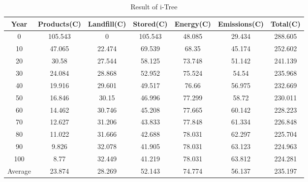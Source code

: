 \documentclass{mcmthesis}
\numberwithin{figure}{section}
\numberwithin{table}{section}
\numberwithin{equation}{section}
\begin{document}
\begin{appendices}
\begin{table}[]
  \caption{Result of i-Tree}\label{iTree}
  \begin{tabular}{
  >{\columncolor[HTML]{FFFFFF}}c |
  >{\columncolor[HTML]{FFFFFF}}c 
  >{\columncolor[HTML]{FFFFFF}}c 
  >{\columncolor[HTML]{FFFFFF}}c 
  >{\columncolor[HTML]{FFFFFF}}c 
  >{\columncolor[HTML]{FFFFFF}}c 
  >{\columncolor[HTML]{FFFFFF}}c }
  \textbf{Year} & \textbf{Products(C)} & \textbf{Landfill(C)} & \textbf{Stored(C)} & \textbf{Energy(C)} & \textbf{Emissions(C)} & \textbf{Total(C)} \\ \hline
  0       & 105.543 & 0      & 105.543 & 48.085 & 29.434 & 288.605 \\
  10      & 47.065  & 22.474 & 69.539  & 68.35  & 45.174 & 252.602 \\
  20      & 30.58   & 27.544 & 58.125  & 73.748 & 51.142 & 241.139 \\
  30      & 24.084  & 28.868 & 52.952  & 75.524 & 54.54  & 235.968 \\
  40      & 19.916  & 29.601 & 49.517  & 76.66  & 56.975 & 232.669 \\
  50      & 16.846  & 30.15  & 46.996  & 77.299 & 58.72  & 230.011 \\
  60      & 14.462  & 30.746 & 45.208  & 77.665 & 60.142 & 228.223 \\
  70      & 12.627  & 31.206 & 43.833  & 77.848 & 61.334 & 226.848 \\
  80      & 11.022  & 31.666 & 42.688  & 78.031 & 62.297 & 225.704 \\
  90      & 9.826   & 32.078 & 41.905  & 78.031 & 63.123 & 224.963 \\
  100     & 8.77    & 32.449 & 41.219  & 78.031 & 63.812 & 224.281 \\
  Average & 23.874  & 28.269 & 52.143  & 74.774 & 56.137 & 235.197
  \end{tabular}
  \end{table}


% 


% 


\end{appendices}
\end{document}
